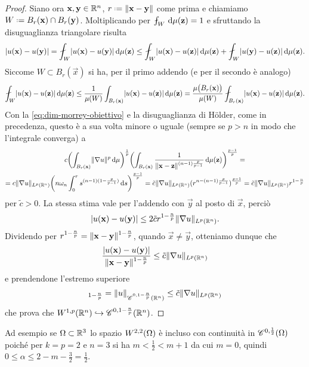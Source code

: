 \begin{proof}
    Siano ora $\vec x,\vec y\in\R^n$, $r\defeq\norm{\vec x-\vec y}$ come prima e chiamiamo $W\defeq B_r(\vec x)\cap B_r(\vec y)$.
    Moltiplicando per $\avint_W\,\dd\mu(\vec z)=1$ e sfruttando la disuguaglianza triangolare risulta
    \begin{equation}
        \abs{u(\vec x)-u(\vec y)}=
        \avint_W \abs{u(\vec x)-u(\vec y)}\,\dd\mu(\vec z)\le
        \avint_W \abs{u(\vec x)-u(\vec z)}\,\dd\mu(\vec z)+\avint_W \abs{u(\vec y)-u(\vec z)}\,\dd\mu(\vec z).
    \end{equation}
    Siccome $W\subset B_r(\vec x)$ si ha, per il primo addendo (e per il secondo è analogo)
    \begin{equation}
        \avint_W \abs{u(\vec x)-u(\vec z)}\,\dd\mu(\vec z)\le
        \frac1{\mu(W)}\int_{B_r(\vec x)}\abs{u(\vec x)-u(\vec z)}\,\dd\mu(\vec z)=
        \frac{\mu\bigl(B_r(\vec x)\bigr)}{\mu(W)}\avint_{B_r(\vec x)}\abs{u(\vec x)-u(\vec z)}\,\dd\mu(\vec z).
    \end{equation}
    Con la \eqref{eq:dim-morrey-obiettivo} e la disuguaglianza di Hölder, come in precedenza, questo è a sua volta minore o uguale (sempre se $p>n$ in modo che l'integrale converga) a
    \begin{multline}
        c\biggl(\int_{B_r(\vec x)}\norm{\grad u}^p\,\dd\mu\biggr)^\frac1{p}\biggl(\int_{B_r(\vec x)}\frac1{\norm{\vec x-\vec z}^{(n-1)\frac{p}{p-1}}}\,\dd\mu(\vec z)\biggr)^\frac{p-1}{p}= \\=
        c\norm{\grad u}_{\leb[p]{\R^n}}\biggl(n\omega_n\int_0^r s^{(n-1)(1-\frac{p}{p-1})}\,\dd s\biggr)^\frac{p-1}{p}=
        \tilde{c}\norm{\grad u}_{\leb[p]{\R^n}}(r^{n-(n-1)\frac{p}{p-1}})^\frac{p-1}{p}=
        \tilde{c}\norm{\grad u}_{\leb[p]{\R^n}}r^{1-\frac{n}{p}}
    \end{multline}
    per $\tilde{c}>0$.
    La stessa stima vale per l'addendo con $\vec y$ al posto di $\vec x$, perciò
    \begin{equation}
        \abs{u(\vec x)-u(\vec y)}\le 2\tilde{c}r^{1-\frac{n}{p}}\norm{\grad u}_{\leb[p]{\R^n}}.
    \end{equation}
    Dividendo per $r^{1-\frac{n}{p}}=\norm{\vec x-\vec y}^{1-\frac{n}{p}}$, quando $\vec x\ne\vec y$, otteniamo dunque che
    \begin{equation}
        \frac{\abs{u(\vec x)-u(\vec y)}}{\norm{\vec x-\vec y}^{1-\frac{n}{p}}}\le\tilde{c}\norm{\grad u}_{\leb[p]{\R^n}}
    \end{equation}
    e prendendone l'estremo superiore
    \begin{equation}
        [u]_{1-\frac{n}{p}}=\norm{u}_{\cont[0,1-\frac{n}{p}]{\R^n}}\le\tilde{c}\norm{\grad u}_{\leb[p]{\R^n}}
    \end{equation}
    che prova che $\sobW[1,p]{\R^n}\emb\cont[0,1-\frac{n}{p}]{\R^n}$.
\end{proof}
Ad esempio se $\Omega\subset\R^3$ lo spazio $\sobW[2,2]{\Omega}$ è incluso con continuità in $\cont[0,\frac12]{\Omega}$ poich\'e per $k=p=2$ e $n=3$ si ha $m<\frac12<m+1$ da cui $m=0$, quindi $0\le\alpha\le 2-m-\frac32=\frac12$.

